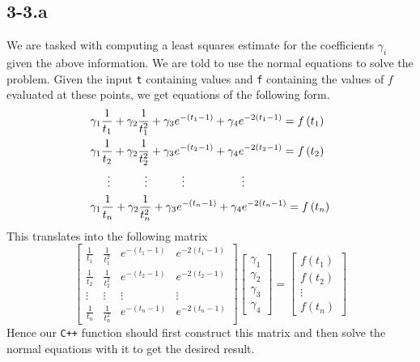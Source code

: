 \documentclass{article}
\begin{document}
\subsection*{3-3.a}
We are tasked with computing a least squares estimate for the coefficients $\gamma_{i}$ given the above information. We are told to use the normal equations to solve the problem. Given the input \verb|t| containing values and \verb|f| containing the values of $f$ evaluated at these points, we get equations of the following form.
\begin{align*}
    &\gamma_{1}\frac{1}{t_{1}} + \gamma_{2}\frac{1}{t_{1}^{2}} + \gamma_{3}e^{-\left(t_{1}-1\right)} + \gamma_{4}e^{-2\left(t_{1}-1\right)} = f\left(t_{1}\right)\\
    &\gamma_{1}\frac{1}{t_{2}} + \gamma_{2}\frac{1}{t_{2}^{2}} + \gamma_{3}e^{-\left(t_{2}-1\right)} + \gamma_{4}e^{-2\left(t_{2}-1\right)} = f\left(t_{2}\right)\\
    &\hspace{15px}\vdots \hspace{30px} \vdots \hspace{30px} \vdots \hspace{50px} \vdots\\
     &\gamma_{1}\frac{1}{t_{n}} + \gamma_{2}\frac{1}{t_{n}^{2}} + \gamma_{3}e^{-\left(t_{n}-1\right)} + \gamma_{4}e^{-2\left(t_{n}-1\right)} = f\left(t_{n}\right)
\end{align*}
This translates into the following matrix 
\begin{equation*}
    \begin{bmatrix}
    \frac{1}{t_{1}} & \frac{1}{t_{1}^{2}} & e^{-\left(t_{1}-1\right)} & e^{-2\left(t_{1}-1\right)} \\[1mm]
    \frac{1}{t_{2}} & \frac{1}{t_{2}^{2}} & e^{-\left(t_{2}-1\right)} & e^{-2\left(t_{2}-1\right)} \\[1mm]
    \vdots & \vdots & \vdots & \vdots  \\[1mm]
    \frac{1}{t_{n}} & \frac{1}{t_{n}^{2}} & e^{-\left(t_{n}-1\right)} & e^{-2\left(t_{n}-1\right)}
    \end{bmatrix}
    \begin{bmatrix}
        \gamma_{1} \\ \gamma_{2} \\ \gamma_{3} \\ \gamma_{4}
    \end{bmatrix} =
    \begin{bmatrix}
        f\left(t_{1}\right) \\
        f\left(t_{2}\right) \\
        \vdots \\
        f\left(t_{n}\right)
    \end{bmatrix}
\end{equation*}
Hence our \verb|C++| function should first construct this matrix and then solve the normal equations with it to get the desired result. 
\end{document}
